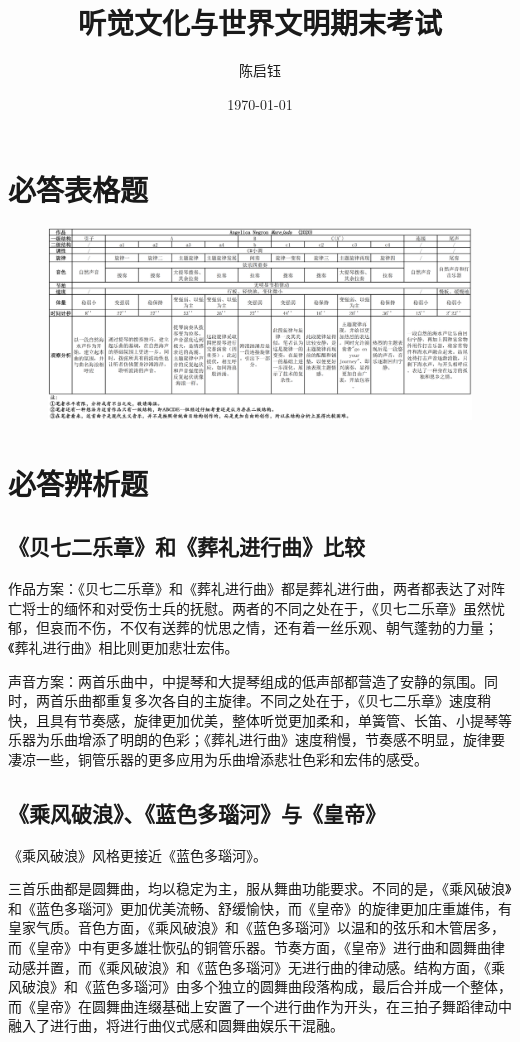 \documentclass{ctexart}
\title{听觉文化与世界文明期末考试}
\author{陈启钰}
\date{\today}
\begin{document}
	\maketitle
	\section{必答表格题}
	\begin{figure}[H]
		\centering
		\includegraphics[width=\linewidth]{marejada.png}
	\end{figure}
	\section{必答辨析题}
	\subsection{《贝七二乐章》和《葬礼进行曲》比较}
	作品方案：《贝七二乐章》和《葬礼进行曲》都是葬礼进行曲，两者都表达了对阵亡将士的缅怀和对受伤士兵的抚慰。两者的不同之处在于，《贝七二乐章》虽然忧郁，但哀而不伤，不仅有送葬的忧思之情，还有着一丝乐观、朝气蓬勃的力量；《葬礼进行曲》相比则更加悲壮宏伟。
	
	声音方案：两首乐曲中，中提琴和大提琴组成的低声部都营造了安静的氛围。同时，两首乐曲都重复多次各自的主旋律。不同之处在于，《贝七二乐章》速度稍快，且具有节奏感，旋律更加优美，整体听觉更加柔和，单簧管、长笛、小提琴等乐器为乐曲增添了明朗的色彩；《葬礼进行曲》速度稍慢，节奏感不明显，旋律要凄凉一些，铜管乐器的更多应用为乐曲增添悲壮色彩和宏伟的感受。
	\subsection{《乘风破浪》、《蓝色多瑙河》与《皇帝》}
	《乘风破浪》风格更接近《蓝色多瑙河》。
	
	三首乐曲都是圆舞曲，均以稳定为主，服从舞曲功能要求。不同的是，《乘风破浪》和《蓝色多瑙河》更加优美流畅、舒缓愉快，而《皇帝》的旋律更加庄重雄伟，有皇家气质。音色方面，《乘风破浪》和《蓝色多瑙河》以温和的弦乐和木管居多，而《皇帝》中有更多雄壮恢弘的铜管乐器。节奏方面，《皇帝》进行曲和圆舞曲律动感并置，而《乘风破浪》和《蓝色多瑙河》无进行曲的律动感。结构方面，《乘风破浪》和《蓝色多瑙河》由多个独立的圆舞曲段落构成，最后合并成一个整体，而《皇帝》在圆舞曲连缀基础上安置了一个进行曲作为开头，在三拍子舞蹈律动中融入了进行曲，将进行曲仪式感和圆舞曲娱乐干混融。
	
\end{document}
